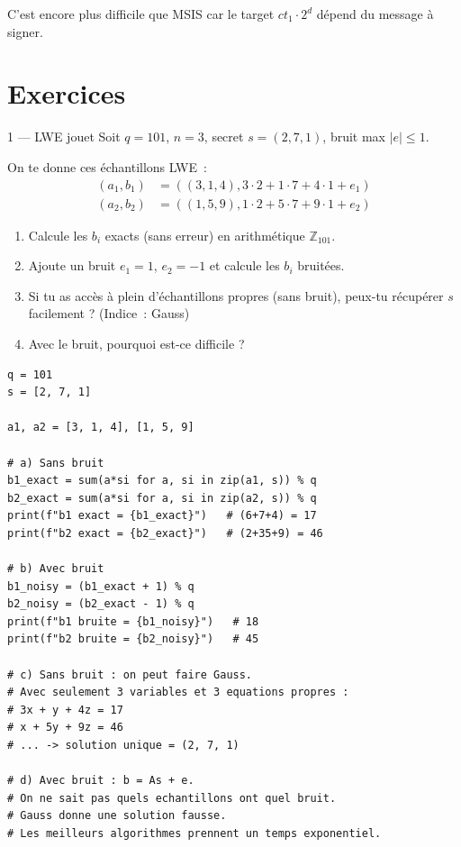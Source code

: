 \documentclass[12pt, a4paper]{article}
\begin{document}
C'est encore plus difficile que MSIS car le target $ct_1 \cdot 2^d$ dépend
du message à signer.

\section{Exercices}

\begin{exercice}{1 --- LWE jouet}
Soit $q = 101$, $n = 3$, secret $s = (2, 7, 1)$, bruit max $|e| \leq 1$.

On te donne ces échantillons LWE~:
\begin{align*}
  (a_1, b_1) &= ((3, 1, 4), 3 \cdot 2 + 1 \cdot 7 + 4 \cdot 1 + e_1)\\
  (a_2, b_2) &= ((1, 5, 9), 1 \cdot 2 + 5 \cdot 7 + 9 \cdot 1 + e_2)
\end{align*}

\begin{enumerate}[label=\alph*)]
  \item Calcule les $b_i$ exacts (sans erreur) en arithmétique $\mathbb{Z}_{101}$.
  \item Ajoute un bruit $e_1 = 1$, $e_2 = -1$ et calcule les $b_i$ bruitées.
  \item Si tu as accès à plein d'échantillons propres (sans bruit), peux-tu
        récupérer $s$ facilement ? (Indice~: Gauss)
  \item Avec le bruit, pourquoi est-ce difficile ?
\end{enumerate}
\end{exercice}

\begin{solution}
\begin{lstlisting}[style=python]
q = 101
s = [2, 7, 1]

a1, a2 = [3, 1, 4], [1, 5, 9]

# a) Sans bruit
b1_exact = sum(a*si for a, si in zip(a1, s)) % q
b2_exact = sum(a*si for a, si in zip(a2, s)) % q
print(f"b1 exact = {b1_exact}")   # (6+7+4) = 17
print(f"b2 exact = {b2_exact}")   # (2+35+9) = 46

# b) Avec bruit
b1_noisy = (b1_exact + 1) % q
b2_noisy = (b2_exact - 1) % q
print(f"b1 bruite = {b1_noisy}")   # 18
print(f"b2 bruite = {b2_noisy}")   # 45

# c) Sans bruit : on peut faire Gauss.
# Avec seulement 3 variables et 3 equations propres :
# 3x + y + 4z = 17
# x + 5y + 9z = 46
# ... -> solution unique = (2, 7, 1)

# d) Avec bruit : b = As + e.
# On ne sait pas quels echantillons ont quel bruit.
# Gauss donne une solution fausse.
# Les meilleurs algorithmes prennent un temps exponentiel.
\end{lstlisting}
\end{solution}
\end{document}
